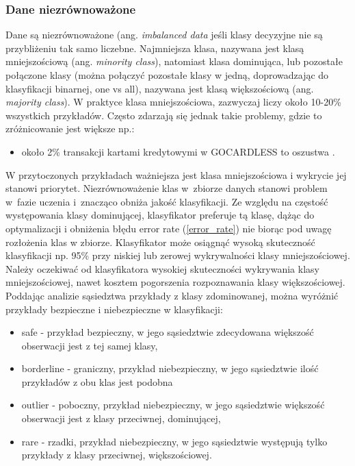\subsubsection{Dane niezrównoważone}
Dane są niezrównoważone (ang. \textit{imbalanced data} jeśli klasy decyzyjne nie są przybliżeniu tak samo liczebne. Najmniejsza klasa, nazywana jest klasą mniejszościową (ang. \textit{minority class}), natomiast klasa dominująca, lub pozostałe połączone klasy (można połączyć pozostałe klasy w jedną, doprowadzając do klasyfikacji binarnej, one vs all), nazywana jest klasą większościową (ang. \textit{majority class}). W praktyce klasa mniejszościowa, zazwyczaj liczy około 10-20\% wszystkich przykładów. Często zdarzają się jednak takie problemy, gdzie to zróżnicowanie jest większe np.:
\begin{itemize}
	\item około 2\% transakcji kartami kredytowymi w GOCARDLESS to oszustwa \cite{gocardless}.

\end{itemize}
W przytoczonych przykładach ważniejsza jest klasa mniejszościowa i wykrycie jej stanowi priorytet. Niezrównoważenie klas w zbiorze danych stanowi problem w fazie uczenia i znacząco obniża jakość klasyfikacji. Ze względu na częstość występowania klasy dominującej, klasyfikator preferuje tą klasę, dążąc do optymalizacji i obniżenia błędu error rate (\ref{error_rate}) nie biorąc pod uwagę rozłożenia klas w zbiorze. Klasyfikator może osiągnąć wysoką skuteczność klasyfikacji np. 95\% przy niskiej lub zerowej wykrywalności klasy mniejszościowej. 
Należy oczekiwać od klasyfikatora wysokiej skuteczności wykrywania klasy mniejszościowej, nawet kosztem pogorszenia rozpoznawania klasy większościowej.
Poddając analizie sąsiedztwa przykłady z klasy zdominowanej, można wyróżnić przykłady bezpieczne i niebezpieczne w klasyfikacji:
\begin{itemize}
	\item safe - przykład bezpieczny, w jego sąsiedztwie zdecydowana większość obserwacji jest z tej samej klasy,
	\item borderline - graniczny, przykład niebezpieczny, w jego sąsiedztwie ilość przykładów z obu klas jest podobna
	\item outlier - poboczny, przykład niebezpieczny, w jego sąsiedztwie większość obserwacji jest z klasy przeciwnej, dominującej,
	\item rare - rzadki, przykład niebezpieczny, w jego sąsiedztwie występują tylko przykłady z klasy przeciwnej, większościowej.
\end{itemize}

